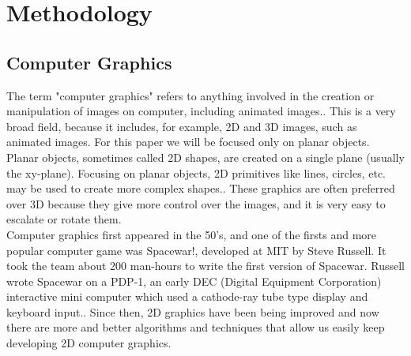 \documentclass[conference]{IEEEtran}
\begin{document}
\section{Methodology}
\subsection{Computer Graphics}
The term "computer graphics" refers to anything involved in the creation or manipulation
of images on computer, including animated images.\cite{ComputerGraphics}. This is a very broad field, because it includes, for example, 2D and 3D images, such as animated images. For this paper we will be focused only on planar objects. Planar objects, sometimes called 2D shapes, are created on a single plane (usually the xy-plane). Focusing on planar objects, 2D primitives like lines, circles, etc. may be used to create more complex shapes.\cite{2DGraphics}. These graphics are often preferred over 3D because they give more control over the images, and it is very easy to escalate or rotate them.\\
Computer graphics first appeared in the 50's, and one of the firsts and more popular computer game was Spacewar!, developed at MIT by Steve Russell. It took the team about 200 man-hours to write the first version of Spacewar. Russell wrote Spacewar on a PDP-1, an early DEC (Digital Equipment Corporation) interactive mini computer which used a cathode-ray tube type display and keyboard input.\cite{SpaceWar}. Since then, 2D graphics have been being improved and now there are more and better algorithms and techniques that allow us easily keep developing 2D computer graphics.
\end{document}
